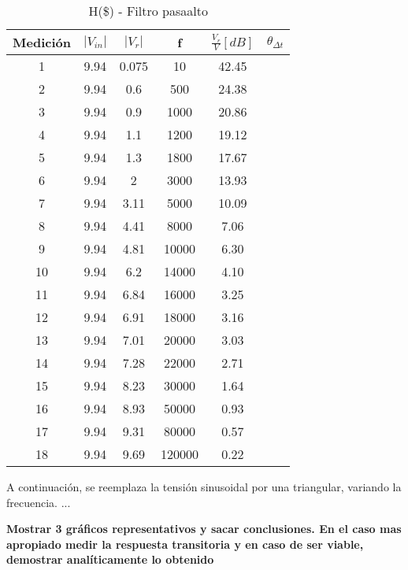 \documentclass[a4paper]{article}
\begin{document}
 \begin{center}
     \begin{table}[H]
     \centering
	   \renewcommand{\arraystretch}{1.3}
     \label{table:Filtro pasaalto}
         \begin{tabular}{c c c c c c }
            \hline 
             Medici\'on  & $|V_{in}|$ &    $|V_r|$ & f&  $\frac{V_r}{V}[dB]$ & $\theta_{\Delta t}$  \\
             \hline
                1	&9.94&	0.075	&10	    &42.45 & \\
                2	&9.94&	0.6	    &500	&24.38 & \\
                3	&9.94&	0.9	    &1000	&20.86 & \\
                4	&9.94&	1.1	    &1200	&19.12 & \\
                5	&9.94&	1.3 	&1800	&17.67 & \\
                6	&9.94&	2	    &3000	&13.93\\
                7	&9.94&	3.11	&5000	&10.09\\
                8	&9.94&	4.41	&8000	&7.06\\
                9	&9.94&	4.81	&10000	&6.30\\
                10	&9.94&	6.2	    &14000	&4.10\\
                11	&9.94&	6.84	&16000	&3.25\\
                12	&9.94&	6.91	&18000	&3.16\\
                13	&9.94&	7.01	&20000	&3.03\\
                14	&9.94&	7.28	&22000	&2.71\\
                15	&9.94&	8.23	&30000	&1.64\\
                16	&9.94&	8.93	&50000	&0.93\\
                17	&9.94&	9.31	&80000	&0.57\\
                18	&9.94&	9.69	&120000	&0.22\\

 \hline
        \end{tabular}
        \caption{H(\$) - Filtro pasaalto}
    \end{table}
\end{center}


A continuación, se reemplaza la tensión sinusoidal por una triangular, variando la frecuencia. ...

\textbf{Mostrar 3 gráficos representativos y sacar conclusiones. En el caso mas apropiado medir la respuesta transitoria y en caso de ser viable, demostrar analíticamente lo obtenido}
\end{document}
